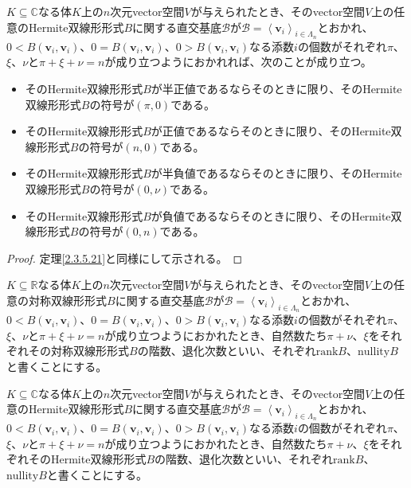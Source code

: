 \documentclass[dvipdfmx]{jsarticle}
\begin{document}
\begin{thm}\label{2.3.5.22}
$K \subseteq \mathbb{C}$なる体$K$上の$n$次元vector空間$V$が与えられたとき、そのvector空間$V$上の任意のHermite双線形形式$B$に関する直交基底$\mathcal{B}$が$\mathcal{B} =\left\langle \mathbf{v}_{i} \right\rangle_{i \in \varLambda_{n}}$とおかれ、$0 < B\left( \mathbf{v}_{i},\mathbf{v}_{i} \right)$、$0 = B\left( \mathbf{v}_{i},\mathbf{v}_{i} \right)$、$0 > B\left( \mathbf{v}_{i},\mathbf{v}_{i} \right)$なる添数$i$の個数がそれぞれ$\pi$、$\xi$、$\nu$と$\pi + \xi + \nu = n$が成り立つようにおかれれば、次のことが成り立つ。
\begin{itemize}
\item
  そのHermite双線形形式$B$が半正値であるならそのときに限り、そのHermite双線形形式$B$の符号が$(\pi,0)$である。
\item
  そのHermite双線形形式$B$が正値であるならそのときに限り、そのHermite双線形形式$B$の符号が$(n,0)$である。
\item
  そのHermite双線形形式$B$が半負値であるならそのときに限り、そのHermite双線形形式$B$の符号が$(0,\nu)$である。
\item
  そのHermite双線形形式$B$が負値であるならそのときに限り、そのHermite双線形形式$B$の符号が$(0,n)$である。
\end{itemize}
\end{thm}
\begin{proof} 定理\ref{2.3.5.21}と同様にして示される。
\end{proof}
\begin{dfn}
$K \subseteq \mathbb{R}$なる体$K$上の$n$次元vector空間$V$が与えられたとき、そのvector空間$V$上の任意の対称双線形形式$B$に関する直交基底$\mathcal{B}$が$\mathcal{B} =\left\langle \mathbf{v}_{i} \right\rangle_{i \in \varLambda_{n}}$とおかれ、$0 < B\left( \mathbf{v}_{i},\mathbf{v}_{i} \right)$、$0 = B\left( \mathbf{v}_{i},\mathbf{v}_{i} \right)$、$0 > B\left( \mathbf{v}_{i},\mathbf{v}_{i} \right)$なる添数$i$の個数がそれぞれ$\pi$、$\xi$、$\nu$と$\pi + \xi + \nu = n$が成り立つようにおかれたとき、自然数たち$\pi + \nu$、$\xi$をそれぞれその対称双線形形式$B$の階数、退化次数といい、それぞれ${\mathrm{rank}}B$、${\mathrm{nullity}}B$と書くことにする。
\end{dfn}
\begin{dfn}
$K \subseteq \mathbb{C}$なる体$K$上の$n$次元vector空間$V$が与えられたとき、そのvector空間$V$上の任意のHermite双線形形式$B$に関する直交基底$\mathcal{B}$が$\mathcal{B} =\left\langle \mathbf{v}_{i} \right\rangle_{i \in \varLambda_{n}}$とおかれ、$0 < B\left( \mathbf{v}_{i},\mathbf{v}_{i} \right)$、$0 = B\left( \mathbf{v}_{i},\mathbf{v}_{i} \right)$、$0 > B\left( \mathbf{v}_{i},\mathbf{v}_{i} \right)$なる添数$i$の個数がそれぞれ$\pi$、$\xi$、$\nu$と$\pi + \xi + \nu = n$が成り立つようにおかれたとき、自然数たち$\pi + \nu$、$\xi$をそれぞれそのHermite双線形形式$B$の階数、退化次数といい、それぞれ${\mathrm{rank}}B$、${\mathrm{nullity}}B$と書くことにする。
\end{dfn}
\end{document}

